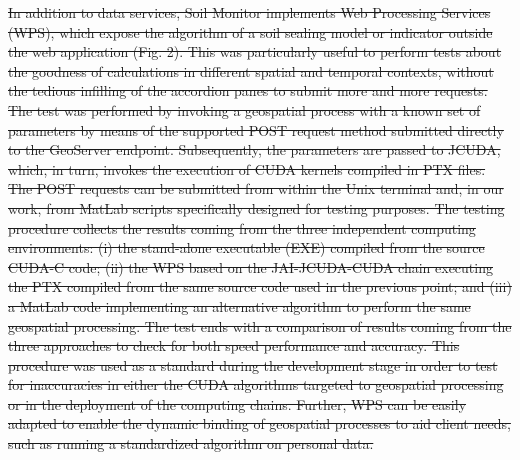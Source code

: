 \documentclass[APA,LATO1COL,doublespace]{WileyNJD-v2}
\providecommand{\DIFdeltex}[1]{{\protect\color{red}\sout{#1}}}                      %
\providecommand{\DIFdel}[1]{\texorpdfstring{\DIFdeltex{#1}}{}} %
\begin{document}
\DIFdel{In addition to data services, Soil Monitor implements Web Processing Services (WPS), which expose the algorithm of a soil sealing model or indicator outside the web application (Fig. 2). 
This was particularly useful to perform tests about the goodness of calculations in different spatial and temporal contexts, without the tedious infilling of the accordion panes to submit more and more requests. 
The test was performed by invoking a geospatial process with a known set of parameters by means of the supported POST request method submitted directly to the GeoServer endpoint. 
Subsequently, the parameters are passed to JCUDA, which, in turn, invokes the execution of CUDA kernels compiled in PTX files. 
The POST requests can be submitted from within the Unix terminal and, in our work, from MatLab scripts specifically designed for testing purposes. 
The testing procedure collects the results coming from the three independent computing environments: 
(i) the stand-alone executable (EXE) compiled from the source CUDA-C code; 
(ii) the WPS based on the JAI-JCUDA-CUDA chain executing the PTX compiled from the same source code used in the previous point; and 
(iii) a MatLab code implementing an alternative algorithm to perform the same geospatial processing. 
The test ends with a comparison of results coming from the three approaches to check for both speed performance and accuracy. 
This procedure was used as a standard during the development stage in order to test for inaccuracies in either the CUDA algorithms targeted to geospatial processing or in the deployment of the computing chains.
Further, WPS can be easily adapted to enable the dynamic binding of geospatial processes to aid client needs, such as running a standardized algorithm on personal data.
}%
\end{document}

